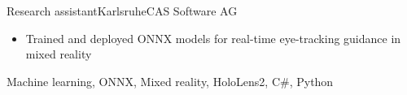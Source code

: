 {\begin{experiences}
        \emptySeparator
        
        \experience
        {}{Research assistant}{Karlsruhe}{CAS Software AG}
        {}  
        {    \ifcvshowcasdetail
            \begin{itemize}
                \item Trained and deployed ONNX models for real-time eye-tracking guidance in mixed reality
            \end{itemize}
            \fi
        }
        {Machine learning, ONNX, Mixed reality, HoloLens2, C\#, Python}
        
        \end{experiences}
    }{
    
}
